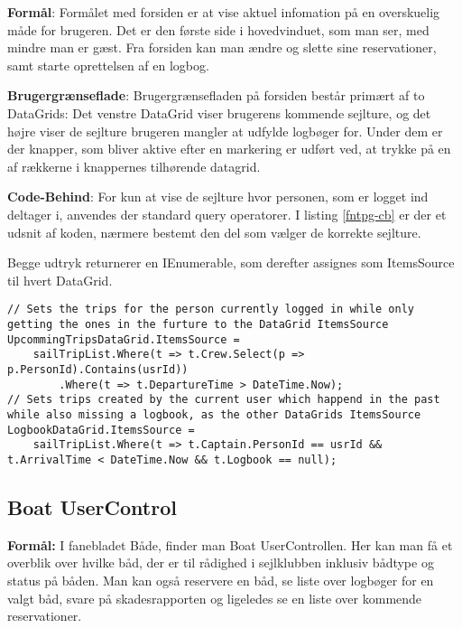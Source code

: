 \textbf{Formål}: 
Formålet med forsiden er at vise aktuel infomation på en overskuelig måde for brugeren.
Det er den første side i hovedvinduet, som man ser, med mindre man er gæst.
Fra forsiden kan man ændre og slette sine reservationer, samt starte oprettelsen af en logbog.

\textbf{Brugergrænseflade}: 
Brugergrænsefladen på forsiden består primært af to DataGrids: Det venstre DataGrid viser brugerens kommende sejlture, og det højre viser de sejlture brugeren mangler at udfylde logbøger for. 
Under dem er der knapper, som bliver aktive efter en markering er udført ved, at trykke på en af rækkerne i knappernes tilhørende datagrid.

\textbf{Code-Behind}: 
For kun at vise de sejlture hvor personen, som er logget ind deltager i, anvendes der standard query operatorer. 
I listing \ref{fntpg-cb} er der et udsnit af koden, nærmere bestemt den del som vælger de korrekte sejlture.

Begge udtryk returnerer en IEnumerable, som derefter assignes som ItemsSource til hvert DataGrid.

\begin{lstlisting}[frame=single, caption=Forsidens Code-Behind, label=fntpg-cb]
// Sets the trips for the person currently logged in while only getting the ones in the furture to the DataGrid ItemsSource
UpcommingTripsDataGrid.ItemsSource =
    sailTripList.Where(t => t.Crew.Select(p => p.PersonId).Contains(usrId))
        .Where(t => t.DepartureTime > DateTime.Now);
// Sets trips created by the current user which happend in the past while also missing a logbook, as the other DataGrids ItemsSource 
LogbookDataGrid.ItemsSource =
    sailTripList.Where(t => t.Captain.PersonId == usrId && t.ArrivalTime < DateTime.Now && t.Logbook == null);
\end{lstlisting}

\subsection{Boat UserControl}

\textbf{Formål:}
I fanebladet Både, finder man Boat UserControllen.
Her kan man få et overblik over hvilke båd, der er til rådighed i sejlklubben inklusiv bådtype og status på båden. 
Man kan også reservere en båd, se liste over logbøger for en valgt båd, svare på skadesrapporten og ligeledes se en liste over kommende reservationer. 

